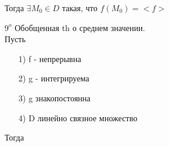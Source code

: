 \begin{enumerate}
Тогда $\exists M_0 \in D$ такая, что $f(M_0) = <f>$


\item[$9^o$]
Обобщенная th о среднем значении. \\
Пусть
	\begin{enumerate}
	\item[1)] 
	f - непрерывна
	
	\item[2)]
	g - интегрируема
	
	\item[3)]
	g знакопостоянна
	
	\item[4)]
	D линейно связное множество
	\end{enumerate}

Тогда
\end{enumerate}
























